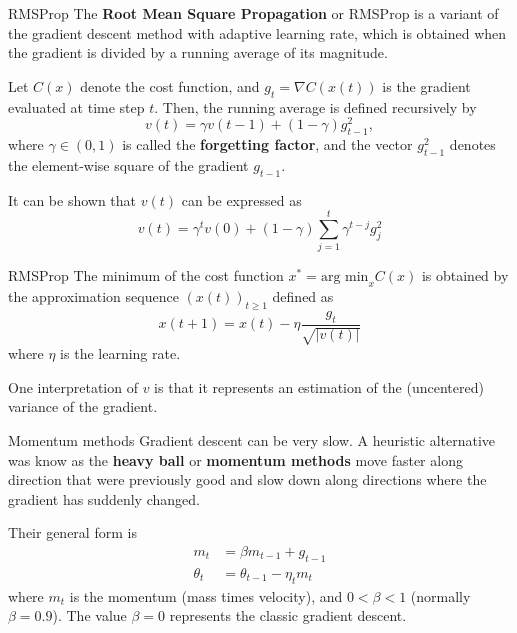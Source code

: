\documentclass{beamer}
\begin{document}
\begin{frame}{RMSProp}
	 The \textbf{Root Mean Square Propagation} or RMSProp is a variant of the gradient descent method with adaptive learning rate, which is obtained when the gradient is divided by a running average of its magnitude.
	 
	 Let $C(x)$ denote the cost function, and $g_t= \nabla C(x(t))$ is the gradient evaluated at time step $t$. Then, the running average is defined recursively by
	 \begin{equation*}
	 	v(t)=\gamma v(t-1)+(1-\gamma)g_{t-1}^2,
	 \end{equation*}
	 where $\gamma\in (0,1)$ is called the \textbf{forgetting factor}, and the vector $g_{t-1}^2$ denotes the element-wise square of the gradient $g_{t-1}$. 
	 
	 It can be shown that  $v(t)$ can be expressed as
	 \begin{equation*}
	 	v(t)= \gamma^t v(0)+ (1-\gamma) \sum_{j=1}^t \gamma^{t-j}g_j^2
	 \end{equation*}
	 
\end{frame}
\begin{frame}{RMSProp}
	The minimum of the cost function $x^* = \text{arg min}_x C(x)$ is obtained by the approximation sequence $(x(t))_{t\ge 1}$ defined as
	\begin{equation*}
		x(t+1)= x(t)- \eta \frac{g_t}{\sqrt{|v(t)|}}
	\end{equation*}
where $\eta$ is the learning rate. 

One interpretation of $v$ is that it represents an estimation of the (uncentered) variance of the gradient. 
\end{frame}

\begin{frame}{Momentum methods}
	Gradient descent can be very slow. A heuristic alternative was know as the \textbf{heavy ball} or \textbf{momentum methods} move faster along direction that were previously good and slow down along directions where the gradient has suddenly changed. 
	
	Their general form is
	\begin{align*}
		m_t&= \beta m_{t-1}+ g_{t-1}\\
		\theta_t &= \theta_{t-1}-\eta_t m_t
	\end{align*}
	where $m_t$ is the momentum (mass times velocity), and $0<\beta <1$ (normally $\beta=0.9$). The value $\beta=0$ represents the classic gradient descent.
\end{frame}
\end{document}

